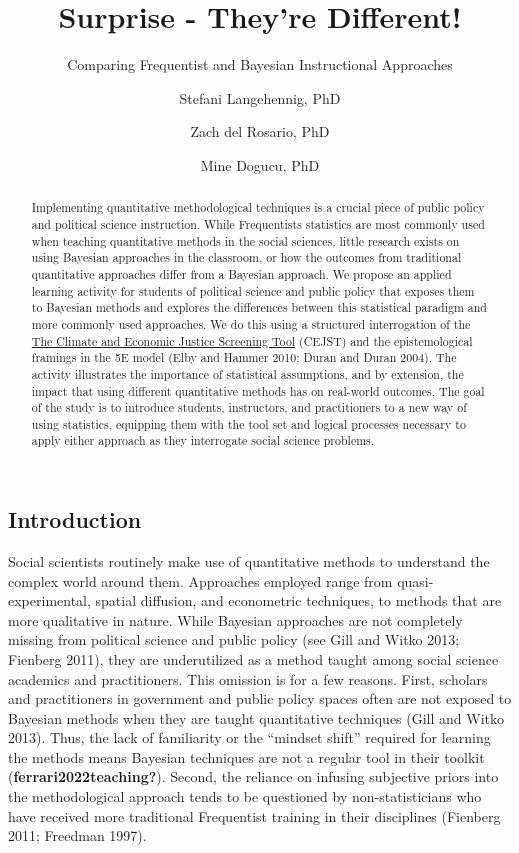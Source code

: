 \documentclass[
  12pt,
  letterpaper,
  DIV=11,
  numbers=noendperiod]{scrartcl}
\title{Surprise - They're Different!}
\subtitle{Comparing Frequentist and Bayesian Instructional Approaches}
\author{Stefani Langehennig, PhD \and Zach del Rosario, PhD \and Mine
Dogucu, PhD}
\date{}
\begin{document}
\maketitle
\begin{abstract}
Implementing quantitative methodological techniques is a crucial piece
of public policy and political science instruction. While Frequentists
statistics are most commonly used when teaching quantitative methods in
the social sciences, little research exists on using Bayesian approaches
in the classroom, or how the outcomes from traditional quantitative
approaches differ from a Bayesian approach. We propose an applied
learning activity for students of political science and public policy
that exposes them to Bayesian methods and explores the differences
between this statistical paradigm and more commonly used approaches. We
do this using a structured interrogation of the
\href{https://screeningtool.geoplatform.gov/en/}{The Climate and
Economic Justice Screening Tool} (CEJST) and the epistemological
framings in the 5E model (Elby and Hammer 2010; Duran and Duran 2004).
The activity illustrates the importance of statistical assumptions, and
by extension, the impact that using different quantitative methods has
on real-world outcomes. The goal of the study is to introduce students,
instructors, and practitioners to a new way of using statistics,
equipping them with the tool set and logical processes necessary to
apply either approach as they interrogate social science problems.
\end{abstract}
\ifdefined\Shaded\renewenvironment{Shaded}{\begin{tcolorbox}[boxrule=0pt, frame hidden, breakable, borderline west={3pt}{0pt}{shadecolor}, interior hidden, enhanced, sharp corners]}{\end{tcolorbox}}\fi

\hypertarget{introduction}{%
\subsection{Introduction}\label{introduction}}

Social scientists routinely make use of quantitative methods to
understand the complex world around them. Approaches employed range from
quasi-experimental, spatial diffusion, and econometric techniques, to
methods that are more qualitative in nature. While Bayesian approaches
are not completely missing from political science and public policy (see
Gill and Witko 2013; Fienberg 2011), they are underutilized as a method
taught among social science academics and practitioners. This omission
is for a few reasons. First, scholars and practitioners in government
and public policy spaces often are not exposed to Bayesian methods when
they are taught quantitative techniques (Gill and Witko 2013). Thus, the
lack of familiarity or the ``mindset shift'' required for learning the
methods means Bayesian techniques are not a regular tool in their
toolkit (\textbf{ferrari2022teaching?}). Second, the reliance on
infusing subjective priors into the methodological approach tends to be
questioned by non-statisticians who have received more traditional
Frequentist training in their disciplines (Fienberg 2011; Freedman
1997).
\end{document}
